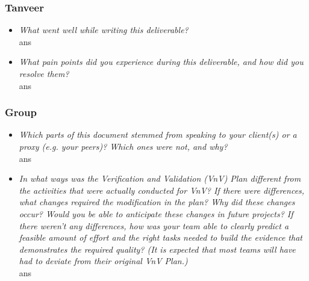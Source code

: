 \documentclass[12pt, titlepage]{article}
\begin{document}
\subsubsection*{Tanveer}
\begin{itemize}
  \item \textit{What went well while writing this deliverable?} \\ 
  
  ans

  \item \textit{What pain points did you experience during this deliverable, and how did you resolve them?}\\ 
  
  ans
\end{itemize}

\subsubsection*{Group}
\begin{itemize}
  \item \textit{Which parts of this document stemmed from speaking to your client(s) or
  a proxy (e.g. your peers)? Which ones were not, and why?} \\ 
  
  ans

  \item \textit{In what ways was the Verification and Validation (VnV) Plan different
  from the activities that were actually conducted for VnV?  If there were
  differences, what changes required the modification in the plan?  Why did
  these changes occur?  Would you be able to anticipate these changes in future
  projects?  If there weren't any differences, how was your team able to clearly
  predict a feasible amount of effort and the right tasks needed to build the
  evidence that demonstrates the required quality?  (It is expected that most
  teams will have had to deviate from their original VnV Plan.)}\\ 
  
  ans
\end{itemize}
\end{document}
